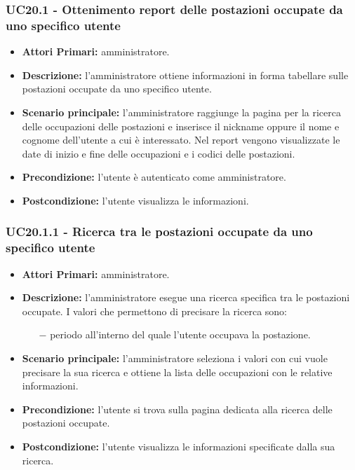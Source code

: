 \subsubsection{ UC20.1 - Ottenimento report delle postazioni occupate da uno specifico utente}
\begin{itemize}
           	\item\textbf{Attori Primari:} 
           	amministratore.
           	\item\textbf{Descrizione:} 
           	l'amministratore ottiene informazioni in forma tabellare sulle postazioni occupate da uno specifico utente.
           	\item\textbf{Scenario principale:} 
           	l'amministratore raggiunge la pagina per la ricerca delle occupazioni delle postazioni e inserisce il nickname oppure il nome e cognome dell'utente a cui è interessato.
           	Nel report vengono visualizzate le date di inizio e fine delle occupazioni e i codici delle postazioni.
           	\item\textbf{Precondizione:} 
           	l'utente è autenticato come amministratore.
           	\item\textbf{Postcondizione:}
           	l'utente visualizza le informazioni.
\end{itemize}

\subsubsection{ UC20.1.1 - Ricerca tra le postazioni occupate da uno specifico utente}
\begin{itemize}
	\item\textbf{Attori Primari:} 
	amministratore.
	\item\textbf{Descrizione:} 
	l'amministratore esegue una ricerca specifica tra le postazioni occupate.
	I valori che permettono di precisare la ricerca sono:
	\begin{itemize}
		\item[$-$] periodo all'interno del quale l'utente occupava la postazione.
	\end{itemize}
	\item\textbf{Scenario principale:} 
	l'amministratore seleziona i valori con cui vuole precisare la sua ricerca e ottiene la lista delle occupazioni con le relative informazioni.
	\item\textbf{Precondizione:} 
	l'utente si trova sulla pagina dedicata alla ricerca delle postazioni occupate.
	\item\textbf{Postcondizione:}
	l'utente visualizza le informazioni specificate dalla sua ricerca.
\end{itemize}

